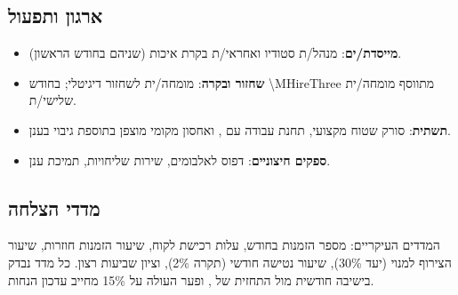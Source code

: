 \subsection{ארגון ותפעול}
\begin{itemize}[leftmargin=*]
  \item \textbf{מייסדת/ים}: מנהל/ת סטודיו ואחראי/ת בקרת איכות (שניהם בחודש הראשון).
  \item \textbf{שחזור ובקרה}: מומחה/ית לשחזור דיגיטלי; בחודש \num{\MHireThree} מתווסף מומחה/ית שלישי/ת.
  \item \textbf{תשתית}: סורק שטוח מקצועי, תחנת עבודה עם , ואחסון מקומי מוצפן בתוספת גיבוי בענן.
  \item \textbf{ספקים חיצוניים}: דפוס לאלבומים, שירות שליחויות, תמיכת ענן.
\end{itemize}

\subsection{מדדי הצלחה}
המדדים העיקריים: מספר הזמנות בחודש, עלות רכישת לקוח, שיעור הזמנות חוזרות, שיעור הצירוף למנוי (יעד \num{30}\%), שיעור נטישה חודשי (תקרה \num{2}\%), וציון שביעות רצון. כל מדד נבדק בישיבה חודשית מול התחזית של , ופער העולה על \num{15}\% מחייב עדכון הנחות.
